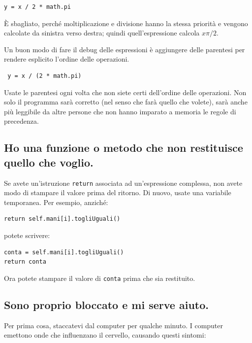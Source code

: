 \documentclass[10pt]{book}
\begin{document}
\begin{verbatim}
y = x / 2 * math.pi
\end{verbatim}
%
È sbagliato, perché moltiplicazione e divisione hanno la stessa priorità e vengono calcolate da sinistra verso destra; quindi quell'espressione calcola $x \pi / 2$.

Un buon modo di fare il debug delle espressioni è aggiungere delle parentesi per rendere esplicito l'ordine delle operazioni.

\begin{verbatim}
 y = x / (2 * math.pi)
\end{verbatim}
%
Usate le parentesi ogni volta che non siete certi dell'ordine delle operazioni. Non solo il programma sarà corretto (nel senso che farà quello che volete), sarà anche più leggibile da altre persone che non hanno imparato a memoria le regole di precedenza.


\subsection{Ho una funzione o metodo che non restituisce quello che voglio.}

Se avete un'istruzione {\tt return} associata ad un'espressione complessa, non avete modo di stampare il valore prima del ritorno. Di nuovo, usate una variabile temporanea. Per esempio, anziché:

\begin{verbatim}
return self.mani[i].togliUguali()
\end{verbatim}
%
potete scrivere:

\begin{verbatim}
conta = self.mani[i].togliUguali()
return conta
\end{verbatim}
%
Ora potete stampare il valore di {\tt conta} prima che sia restituito.


\subsection{Sono proprio bloccato e mi serve aiuto.}

Per prima cosa, staccatevi dal computer per qualche minuto. I computer emettono onde che influenzano il cervello, causando questi sintomi:
\end{document}
